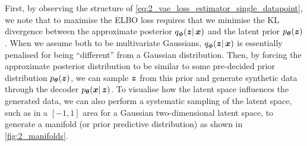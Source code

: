First, by observing the structure of \eqref{eq:2_vae_loss_estimator_single_datapoint}, we note that to maximise the ELBO loss requires that we minimise the KL divergence between the approximate posterior $q_{\boldsymbol{\phi}}(\boldsymbol{z} |\, \boldsymbol{x})$ and the latent prior $p_{\boldsymbol{\theta}}(\boldsymbol{z})$. When we assume both to be multivariate Gaussians, $q_{\boldsymbol{\phi}}(\boldsymbol{z} |\, \boldsymbol{x})$ is essentially penalised for being ``different'' from a Gaussian distribution.
Then, by forcing the approximate posterior distribution to be similar to some pre-decided prior distribution $p_{\boldsymbol{\theta}}(\boldsymbol{z})$, we can sample $\boldsymbol{z}$ from this prior and generate synthetic data through the decoder $p_{\boldsymbol{\theta}}(\boldsymbol{x} |\, \boldsymbol{z})$. To visualise how the latent space influences the generated data, we can also perform a systematic sampling of the latent space, such as in a $[-1, 1]$ area for a Gaussian two-dimensional latent space, to generate a manifold (or prior predictive distribution) as shown in \cref{fig:2_manifolds}.
